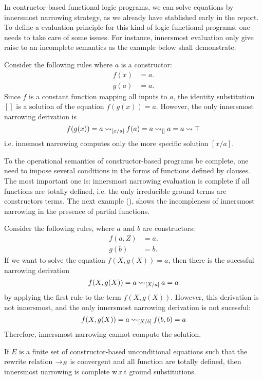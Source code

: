 In contructor-based functional logic programs, we can solve equations by innersmost narrowing strategy, as we already have stablished early in the report. To define a evaluation principle for this kind of logic functional programs, one needs to take care of some issues. For instance, innersmost evaluation only give raise to an incomplete semantics as the example below shall demonstrate.
\begin{example}
    Consider the following rules where $a$ is a constructor:
    \begin{align*}
        f(x) &= a. \\
        g(a) &= a.
    \end{align*}
    Since $f$ is a constant function mapping all inputs to $a$, the identity substitution $[]$ is a solution of the equation $f(g(x)) = a$. However, the only innersmost narrowing derivation is
    $$f(g(x)) = a \mathbin{\rightsquigarrow}_{[x/a]} f(a) = a \mathbin{\rightsquigarrow}_{[]} a = a \mathbin{\rightsquigarrow} \top$$
    i.e. innemost narrowing computes only the more specific solution $[x / a]$.
\end{example}

To the operational semantics of constructor-based programs be complete, one need to impose several conditions in the forms of functions defined by clauses. The most important one is: innersmost narrowing evaluation is complete if all functions are totally defined, i.e. the only irreducible ground terms are constructors terms. The next example (\cite{HANUS1994583}), shows the incompleness of innersmost narrowing in the presence of partial functions.

\begin{example}
    Consider the following rules, where $a$ and $b$ are constructors:
    \begin{align*}
        f(a, Z) &= a. \\
        g(b) &= b.
    \end{align*}
    If we want to solve the equation $f(X, g(X)) = a$, then there is the sucessful narrowing derivation
    $$f(X, g(X)) = a \mathbin{\rightsquigarrow}_{[X / a]} a = a$$
    by applying the first rule to the term $f(X, g(X))$. However, this derivation is not innersmost, and the only innersmost narrowing derivation is not sucessful:
    $$f(X,g(X)) = a \mathbin{\rightsquigarrow}_{[X/b]} f(b,b) = a$$
    Therefore, innersmost narrowing cannot compute the solution.
\end{example}

\begin{theorem}
    If $E$ is a finite set of constructor-based unconditional equations such that the rewrite relation $\rightarrow_E$ is convergent and all function are totally defined, then innersmost narrowing is complete w.r.t ground substitutions.
\end{theorem}


